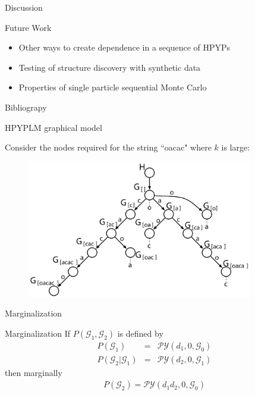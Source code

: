 \documentclass{beamer}
\newcommand{\G}{\mathcal{G}}
\newcommand{\PY}{\mathcal{P}\mathcal{Y}}
\begin{document}
\begin{frame}[t]{Discussion}
	\begin{block}{Future Work}
		\begin{itemize}
			\item Other ways to create dependence in a sequence of HPYPs
			\item Testing of structure discovery with synthetic data
			\item Properties of single particle sequential Monte Carlo
		\end{itemize}
	\end{block}
\end{frame}

\begin{frame}[t,allowframebreaks]{Bibliograpy}
	
\end{frame}

\begin{frame}[t]{HPYPLM graphical model}
	
	Consider the nodes required for the string ``oacac" where $k$ is large: 
	\begin{figure}[t]
		\begin{center}
			\includegraphics[height = 6cm]{../figs/prefix_trie_not_coloured.pdf}
		\end{center}
	\end{figure}
\end{frame}

\begin{frame}[t]{Marginalization}
	\begin{block}{Marginalization \cite{Pitman1999}}
		If $P(\G_1, \G_2)$ is defined by
		\begin{eqnarray*}
			P(\G_1) &=&  \PY(d_1, 0, \G_0) \\
			P(\G_2 | \G_1) &=& \PY(d_2, 0, \G_1)
		\end{eqnarray*}
		then marginally 
		\begin{eqnarray*}
			P(\G_2) =  \PY(d_1 d_2, 0, \G_0)
		\end{eqnarray*}
	\end{block}	
\end{frame}
\end{document}
